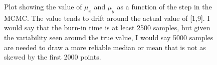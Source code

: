 \documentclass[twocolumn,11pt]{article}
\begin{document}
\begin{figure}[!h]
	\centering
	\noindent
      \caption{Plot showing the value of $\mu_x$ and $\mu_y$ as a function of the step in the MCMC. The value tends to drift around the actual value of [1,9]. I would say that the burn-in time is at least 2500 samples, but given the variability seen around the true value, I would say 5000 samples are needed to draw a more reliable median or mean that is not as skewed by the first 2000 points.}
\end{figure}
\end{document}
